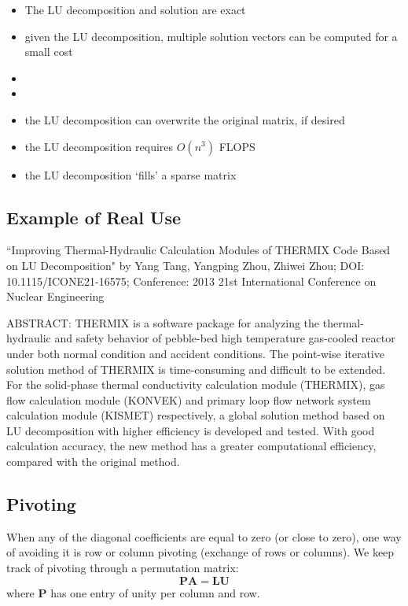 \documentclass[12pt]{exam}
\newcommand{\ve}[1]{\ensuremath{\mathbf{#1}}}
\begin{document}
\begin{itemize}
\ifprintanswers
\item The LU decomposition and solution are exact
\item given the LU decomposition, multiple solution vectors can be computed for a small cost
\else
\item 
\item 
\fi
\item the LU decomposition can overwrite the original matrix, if desired
\item the LU decomposition requires $O(n^3)$ FLOPS
\item the LU decomposition `fills' a sparse matrix
\end{itemize}	

\subsection*{Example of Real Use}
``Improving Thermal-Hydraulic Calculation Modules of THERMIX Code Based on LU Decomposition"
by Yang Tang, Yangping Zhou, Zhiwei Zhou;
DOI: 10.1115/ICONE21-16575; Conference: 2013 21st International Conference on Nuclear Engineering

ABSTRACT: THERMIX is a software package for analyzing the thermal-hydraulic and safety behavior of pebble-bed high temperature gas-cooled reactor under both normal condition and accident conditions. The point-wise iterative solution method of THERMIX is time-consuming and difficult to be extended. For the solid-phase thermal conductivity calculation module (THERMIX), gas flow calculation module (KONVEK) and primary loop flow network system calculation module (KISMET) respectively, a global solution method based on LU decomposition with higher efficiency is developed and tested. With good calculation accuracy, the new method has a greater computational efficiency, compared with the original method.

\subsection*{Pivoting}
When any of the diagonal coefficients are equal to zero (or close to zero), one way of avoiding it is row or column pivoting (exchange of rows or columns). We keep track of pivoting through a permutation matrix:
\ifprintanswers
\[\ve{P}\ve{A} = \ve{L}\ve{U}\]
where $\ve{P}$ has one entry of unity per column and row.
\else
\\\vspace*{3em}
\fi
\end{document}
